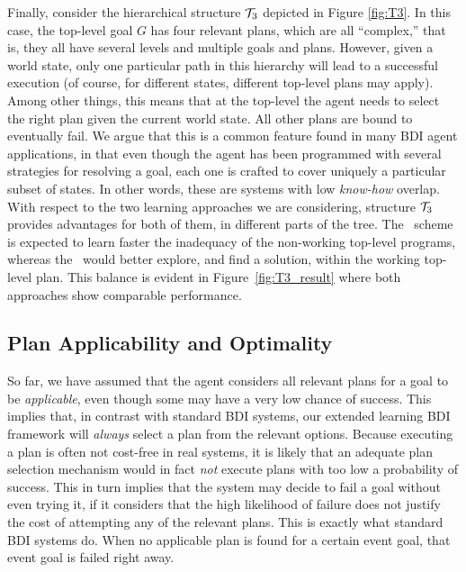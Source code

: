 Finally, consider the hierarchical structure ${\mathcal{T}}_3$ depicted in Figure
\ref{fig:T3}.
In this case, the top-level goal $G$ has four relevant plans, which are all
``complex,'' that is, they all have several levels and multiple goals and plans.
However, given a world state, only one particular path in this hierarchy will
lead to a successful execution (of course, for different states, different
top-level plans may apply). Among other things, this means that at the top-level
the agent needs to select the right plan given the current world state. All 
other plans are bound to eventually fail.
We argue that this is a common feature found in many BDI agent applications, in
that even though the agent has been programmed with several strategies for
resolving a goal, each one is crafted to cover uniquely a particular subset of
states. In other words, these are systems with low \emph{know-how} overlap.
With respect to the two learning approaches we are considering, structure ${\mathcal{T}}_3$
provides advantages for both of them, in different parts of the tree. The \CL\
scheme is expected to learn faster the inadequacy of the non-working top-level
programs, whereas the \BUL\ would better explore, and find a solution, within the
working top-level plan. This balance is evident in Figure~\ref{fig:T3_result} 
where both approaches show comparable performance.




\subsection{Plan Applicability and Optimality}

So far, we have assumed that the agent considers all relevant plans
for a goal to be \emph{applicable}, even though some may have a very
low chance of success.
This implies that, in contrast with standard BDI systems, our extended
learning BDI framework will \emph{always} select a plan from the relevant
options.
Because executing a plan is often not cost-free in real systems, it is likely
that an adequate plan selection mechanism would in fact \emph{not} execute plans
with too low a probability of success. This in turn implies that the system
may decide to fail a goal without even trying it, if it
considers that the high likelihood of failure does not justify the
cost of attempting any of the relevant plans.
This is exactly what standard BDI systems do. When no applicable plan
is found for a certain event goal, that event goal is failed right away.


